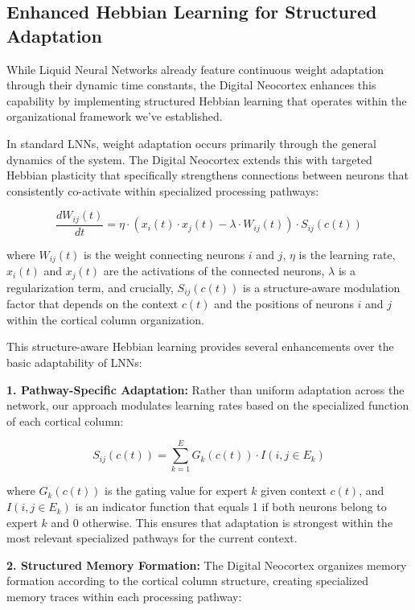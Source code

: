 \documentclass{article}
\begin{document}
\subsection{Enhanced Hebbian Learning for Structured Adaptation}
While Liquid Neural Networks already feature continuous weight adaptation through their dynamic time constants, the Digital Neocortex enhances this capability by implementing structured Hebbian learning that operates within the organizational framework we've established.

In standard LNNs, weight adaptation occurs primarily through the general dynamics of the system. The Digital Neocortex extends this with targeted Hebbian plasticity that specifically strengthens connections between neurons that consistently co-activate within specialized processing pathways:

\begin{equation}
\frac{dW_{ij}(t)}{dt} = \eta \cdot (x_i(t) \cdot x_j(t) - \lambda \cdot W_{ij}(t)) \cdot S_{ij}(c(t))
\end{equation}

where $W_{ij}(t)$ is the weight connecting neurons $i$ and $j$, $\eta$ is the learning rate, $x_i(t)$ and $x_j(t)$ are the activations of the connected neurons, $\lambda$ is a regularization term, and crucially, $S_{ij}(c(t))$ is a structure-aware modulation factor that depends on the context $c(t)$ and the positions of neurons $i$ and $j$ within the cortical column organization.

This structure-aware Hebbian learning provides several enhancements over the basic adaptability of LNNs:

\textbf{1. Pathway-Specific Adaptation:} Rather than uniform adaptation across the network, our approach modulates learning rates based on the specialized function of each cortical column:

\begin{equation}
S_{ij}(c(t)) = \sum_{k=1}^{E} G_k(c(t)) \cdot I(i,j \in E_k)
\end{equation}

where $G_k(c(t))$ is the gating value for expert $k$ given context $c(t)$, and $I(i,j \in E_k)$ is an indicator function that equals 1 if both neurons belong to expert $k$ and 0 otherwise. This ensures that adaptation is strongest within the most relevant specialized pathways for the current context.

\textbf{2. Structured Memory Formation:} The Digital Neocortex organizes memory formation according to the cortical column structure, creating specialized memory traces within each processing pathway:
\end{document}
